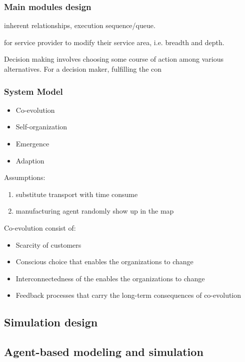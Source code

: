 \subsubsection{Main modules design}
\label{subsub:main_modules}
inherent relationships, execution sequence/queue.

for service provider to modify their service area, i.e. breadth and depth.

Decision making involves choosing some course of action among various alternatives. For a decision maker, fulfilling the con

\subsubsection{System Model}
\begin{itemize}
    \item Co-evolution
    \item Self-organization
    \item Emergence 
    \item Adaption
\end{itemize}

Assumptions:
\begin{enumerate}
    \item substitute transport with time consume
    \item manufacturing agent randomly show up in the map
\end{enumerate}

Co-evolution consist of:
\begin{itemize}
    \item Scarcity of customers
    \item Conscious choice that enables the organizations to change
    \item Interconnectedness of the enables the organizations to change
    \item Feedback processes that carry the long-term consequences of co-evolution
\end{itemize}


\subsection{Simulation design} %
\label{sub:simulation_design}


\subsection{Agent-based modeling and simulation} %
\label{sub:agent_based_modeling_and_simulation}
